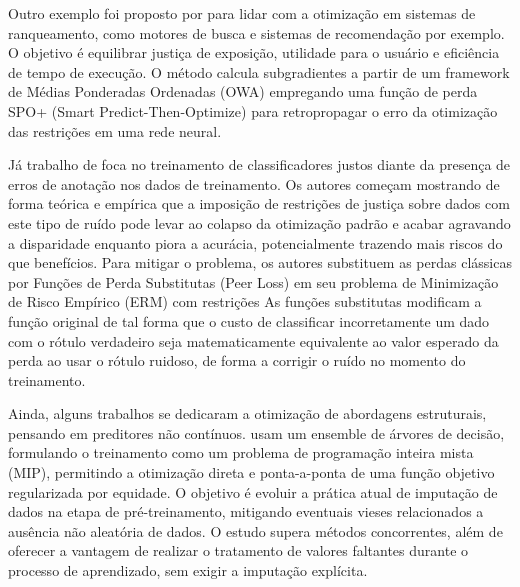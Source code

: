 Outro exemplo foi proposto por \citet{dinh2024learning} para lidar com a otimização em sistemas de ranqueamento, como motores de busca e sistemas de recomendação por exemplo. O objetivo é equilibrar justiça de exposição, utilidade para o usuário e eficiência de tempo de execução. O método calcula subgradientes a partir de um framework de Médias Ponderadas Ordenadas (OWA) empregando uma função de perda SPO+ (Smart Predict-Then-Optimize) para retropropagar o erro da otimização das restrições em uma rede neural. %

Já trabalho de \citet{wang2021fair} foca no treinamento de classificadores justos diante da presença de erros de anotação nos dados de treinamento. Os autores começam mostrando de forma teórica e empírica que a imposição de restrições de justiça sobre dados com este tipo de ruído pode levar ao colapso da otimização padrão e acabar agravando a disparidade enquanto piora a acurácia, potencialmente trazendo mais riscos do que benefícios. Para mitigar o problema, os autores substituem as perdas clássicas por Funções de Perda Substitutas (Peer Loss) em seu problema de Minimização de Risco Empírico (ERM) com restrições
As funções substitutas modificam a função original de tal forma que o custo de classificar incorretamente um dado com o rótulo verdadeiro seja matematicamente equivalente ao valor esperado da perda ao usar o rótulo ruidoso, de forma a corrigir o ruído no momento do treinamento.

Ainda, alguns trabalhos se dedicaram a otimização de abordagens estruturais, pensando em preditores não contínuos. \citet{jeong2022fairness} usam um ensemble de árvores de decisão, formulando o treinamento como um problema de programação inteira mista (MIP), permitindo a otimização direta e ponta-a-ponta de uma função objetivo regularizada por equidade. O objetivo é evoluir a prática atual de imputação de dados na etapa de pré-treinamento, mitigando eventuais vieses relacionados a ausência não aleatória de dados. O estudo supera métodos concorrentes, além de oferecer a vantagem de realizar o tratamento de valores faltantes durante o processo de aprendizado, sem exigir a imputação explícita.

